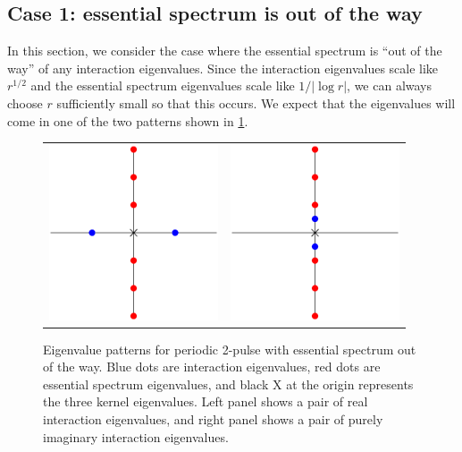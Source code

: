 \documentclass[thesis.tex]{subfiles}
\begin{document}
\subsection{Case 1: essential spectrum is out of the way}\label{section:2pernobubble}

In this section, we consider the case where the essential spectrum is ``out of the way'' of any interaction eigenvalues. Since the interaction eigenvalues scale like $r^{1/2}$ and the essential spectrum eigenvalues scale like $1/|\log r|$, we can always choose $r$ sufficiently small so that this occurs. We expect that the eigenvalues will come in one of the two patterns shown in \cref{fig:2ppatterns}.

\begin{figure}[H]
\begin{center}
\begin{tabular}{cc}
\includegraphics[width=5cm]{images/kdv5/2punstableeigpattern.eps} &
\includegraphics[width=5cm]{images/kdv5/2pstableeigpattern.eps} 
\end{tabular}
\caption{Eigenvalue patterns for periodic 2-pulse with essential spectrum out of the way. Blue dots are interaction eigenvalues, red dots are essential spectrum eigenvalues, and black X at the origin represents the three kernel eigenvalues. Left panel shows a pair of real interaction eigenvalues, and right panel shows a pair of purely imaginary interaction eigenvalues. }
\label{fig:2ppatterns}
\end{center}
\end{figure}
\end{document}
